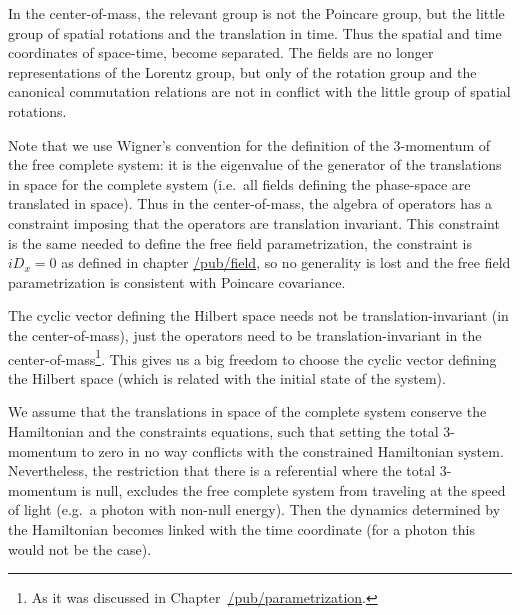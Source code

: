 \documentclass[11pt]{book}
\begin{document}
In the center-of-mass, the relevant group is not the Poincare group, but
the little group of spatial rotations and the translation in
time\cite{Wigner1939On}. Thus the
spatial and time coordinates of space-time, become separated. The fields
are no longer representations of the Lorentz group, but only of the
rotation group and the canonical commutation relations are not in
conflict with the little group of spatial rotations.

Note that we use Wigner's convention for the definition of the
3-momentum of the free complete system: it is the eigenvalue of the
generator of the translations in space for the complete system (i.e.~all
fields defining the phase-space are translated in space). Thus in the
center-of-mass, the algebra of operators has a constraint imposing that
the operators are translation invariant. This constraint is the same
needed to define the free field parametrization, the constraint is
\(iD_x=0\) as defined in chapter
\href{https://timepiece.pubpub.org/pub/field}{/pub/field}, so no
generality is lost and the free field parametrization is consistent with
Poincare covariance.

The cyclic vector defining the Hilbert space needs not be
translation-invariant (in the center-of-mass), just the operators need
to be translation-invariant in the center-of-mass\footnote{As it was
  discussed in
  Chapter~\href{https://timepiece.pubpub.org/pub/parametrization/\#gauge-transformations-constrained-systems-and-conditioned-probability}{/pub/parametrization}.}.
This gives us a big freedom to choose the cyclic vector defining the
Hilbert space (which is related with the initial state of the system).

We assume that the translations in space of the complete system conserve
the Hamiltonian and the constraints equations, such that setting the
total 3-momentum to zero in no way conflicts with the constrained
Hamiltonian system. Nevertheless, the restriction that there is a
referential where the total 3-momentum is null, excludes the free
complete system from traveling at the speed of light (e.g.~a photon with
non-null energy). Then the dynamics determined by the Hamiltonian
becomes linked with the time coordinate (for a photon this would not be
the case\cite{Dirac1949Forms}).
\end{document}
